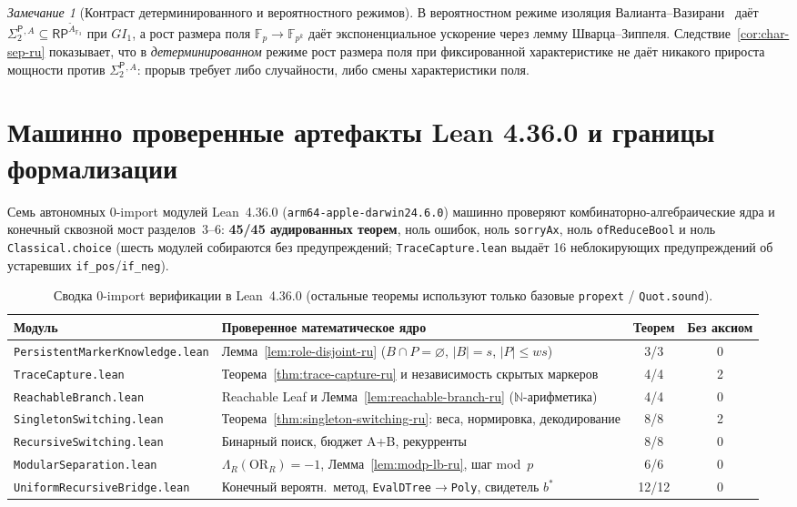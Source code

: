 \documentclass[11pt,a4paper]{article}
\theoremstyle{definition}
\theoremstyle{remark}
\newtheorem{remark}[theorem]{Замечание}
\newcommand{\RP}{\mathsf{RP}}
\newcommand{\SigTwo}{\Sigma_2^{\mathsf{P}}}
\newcommand{\OR}{\mathrm{OR}}
\newcommand{\F}{\mathbb{F}}
\newcommand{\GI}{GI_1}
\begin{document}
\begin{remark}[Контраст детерминированного и вероятностного режимов]
В вероятностном режиме изоляция Валианта--Вазирани~\cite{ValiantVazirani1986} даёт $\SigTwo{}^{,A} \subseteq \RP^{\widetilde{A}_{\F_3}}$ при $\GI$, а рост размера поля $\F_p \to \F_{p^k}$ даёт экспоненциальное ускорение через лемму Шварца--Зиппеля. Следствие~\ref{cor:char-sep-ru} показывает, что в \emph{детерминированном} режиме рост размера поля при фиксированной характеристике не даёт никакого прироста мощности против $\SigTwo{}^{,A}$: прорыв требует либо случайности, либо смены характеристики поля.
\end{remark}

\appendix
\section{Машинно проверенные артефакты Lean 4.36.0 и границы формализации}

Семь автономных 0-import модулей Lean~4.36.0 (\texttt{arm64-apple-darwin24.6.0}) машинно проверяют комбинаторно-алгебраические ядра и конечный сквозной мост разделов~3--6: \textbf{45/45 аудированных теорем}, ноль ошибок, ноль \texttt{sorryAx}, ноль \texttt{ofReduceBool} и ноль \texttt{Classical.choice} (шесть модулей собираются без предупреждений; \texttt{TraceCapture.lean} выдаёт 16 неблокирующих предупреждений об устаревших \texttt{if\_pos}/\texttt{if\_neg}).

\begin{table}[!htbp]
\centering
\begin{tabularx}{\linewidth}{lXcc}
\toprule
\textbf{Модуль} & \textbf{Проверенное математическое ядро} & \textbf{Теорем} & \textbf{Без аксиом} \\
\midrule
\texttt{PersistentMarkerKnowledge.lean} & Лемма~\ref{lem:role-disjoint-ru} ($B \cap P = \varnothing$, $|B|=s$, $|P|\le ws$) & 3/3 & 0 \\
\texttt{TraceCapture.lean} & Теорема~\ref{thm:trace-capture-ru} и независимость скрытых маркеров & 4/4 & 2 \\
\texttt{ReachableBranch.lean} & Reachable Leaf и Лемма~\ref{lem:reachable-branch-ru} ($\mathbb{N}$-арифметика) & 4/4 & 0 \\
\texttt{SingletonSwitching.lean} & Теорема~\ref{thm:singleton-switching-ru}: веса, нормировка, декодирование & 8/8 & 2 \\
\texttt{RecursiveSwitching.lean} & Бинарный поиск, бюджет A+B, рекурренты & 8/8 & 0 \\
\texttt{ModularSeparation.lean} & $\Lambda_R(\OR_R)=-1$, Лемма~\ref{lem:modp-lb-ru}, шаг mod~$p$ & 6/6 & 0 \\
\texttt{UniformRecursiveBridge.lean} & Конечный вероятн.\ метод, \texttt{EvalDTree}$\to$\texttt{Poly}, свидетель $b^*$ & 12/12 & 0 \\
\bottomrule
\end{tabularx}
\caption{Сводка 0-import верификации в Lean~4.36.0 (остальные теоремы используют только базовые \texttt{propext} / \texttt{Quot.sound}).}
\end{table}
\end{document}
